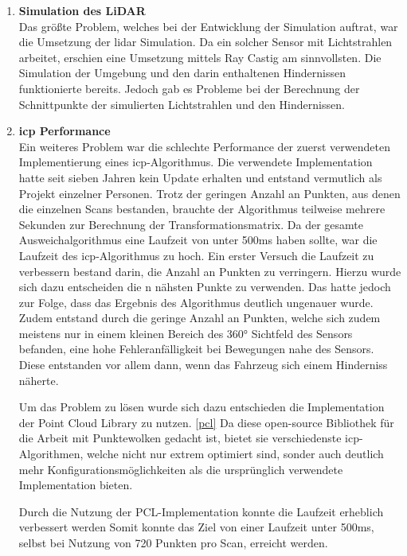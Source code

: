 \begin{enumerate}[leftmargin=*]
    \item \textbf{Simulation des LiDAR} \\
    Das größte Problem, welches bei der Entwicklung der Simulation auftrat, war die Umsetzung der \ac{lidar} Simulation.
    Da ein solcher Sensor mit Lichtstrahlen arbeitet, erschien eine Umsetzung mittels Ray Castig am sinnvollsten.
    Die Simulation der Umgebung und den darin enthaltenen Hindernissen funktionierte bereits.
    Jedoch gab es Probleme bei der Berechnung der Schnittpunkte der simulierten Lichtstrahlen und den Hindernissen.

    \item \textbf{\ac{icp} Performance} \\
    Ein weiteres Problem war die schlechte Performance der zuerst verwendeten Implementierung eines \acf{icp}-Algorithmus.
    Die verwendete Implementation hatte seit sieben Jahren kein Update erhalten und entstand vermutlich als Projekt einzelner Personen.
    Trotz der geringen Anzahl an Punkten, aus denen die einzelnen Scans bestanden, brauchte der Algorithmus teilweise mehrere Sekunden zur Berechnung der Transformationsmatrix.
    Da der gesamte Ausweichalgorithmus eine Laufzeit von unter 500ms haben sollte, war die Laufzeit des \ac{icp}-Algorithmus zu hoch.
    Ein erster Versuch die Laufzeit zu verbessern bestand darin, die Anzahl an Punkten zu verringern.
    Hierzu wurde sich dazu entscheiden die n nähsten Punkte zu verwenden.
    Das hatte jedoch zur Folge, dass das Ergebnis des Algorithmus deutlich ungenauer wurde.
    Zudem entstand durch die geringe Anzahl an Punkten, welche sich zudem meistens nur in einem kleinen Bereich des 360° Sichtfeld des Sensors befanden, 
    eine hohe Fehleranfälligkeit bei Bewegungen nahe des Sensors.
    Diese entstanden vor allem dann, wenn das Fahrzeug sich einem Hinderniss näherte.

    Um das Problem zu lösen wurde sich dazu entschieden die Implementation der Point Cloud Library zu nutzen. \ref{pcl}
    Da diese open-source Bibliothek für die Arbeit mit Punktewolken gedacht ist, bietet sie verschiedenste \ac{icp}-Algorithmen,
    welche nicht nur extrem optimiert sind, sonder auch deutlich mehr Konfigurationsmöglichkeiten als die ursprünglich verwendete Implementation bieten.
    
    Durch die Nutzung der PCL-Implementation konnte die Laufzeit erheblich verbessert werden
    Somit konnte das Ziel von einer Laufzeit unter 500ms, selbst bei Nutzung von 720 Punkten pro Scan, erreicht werden.


\end{enumerate}
